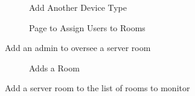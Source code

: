 \documentclass{report}
\begin{document}
\begin{figure}[H]
\caption{Add Another Device Type}
\end{figure}

\begin{figure}[H]
\caption{Page to Assign Users to Rooms}
\end{figure}
Add an admin to oversee a server room

\begin{figure}[H]
\caption{Adds a Room}
\end{figure}
Add a server room to the list of rooms to monitor
\end{document}
